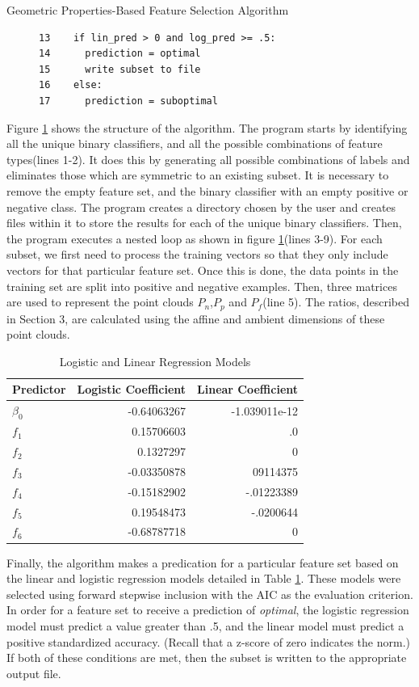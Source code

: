 \documentclass{llncs}
\begin{document}
\begin{section}{Geometric Properties-Based Feature Selection Algorithm}
\begin{figure}[h]
\begin{lstlisting}
13	  if lin_pred > 0 and log_pred >= .5:
14		prediction = optimal
15		write subset to file
16	  else:
17		prediction = suboptimal
\end{lstlisting}
\label{fig:code}
\end{figure}
Figure \ref{fig:code} shows the structure of the algorithm. The program starts by identifying all the unique binary classifiers, and all the possible combinations of feature types(lines 1-2). It does this by generating all possible combinations of  labels and eliminates those which are symmetric to an existing subset. It is necessary to remove the empty feature set, and the binary classifier with an empty positive or negative class. The program creates a directory chosen by the user and creates files within it to store the results for each of the unique binary classifiers. Then, the program executes a nested loop as shown in figure \ref{fig:code}(lines 3-9). 
For each subset, we first need to process the training vectors so that they only include vectors for that particular feature set. Once this is done, the data points in the training set are split into positive and negative examples. Then, three matrices are used to represent the point clouds $P_n$,$P_p$ and $P_f$(line 5). The ratios, described in Section 3, are calculated using the affine and ambient dimensions of these point clouds.
\begin{table}[ht]
\centering
\caption{Logistic and Linear Regression Models}
\begin{tabular}{l r r }
\hline \hline
Predictor&Logistic Coefficient & Linear Coefficient \\
\hline
$\beta_0$&-0.64063267&-1.039011e-12\\
$f_1$&0.15706603&.0\\
$f_2$&0.1327297& 0\\
$f_3$&-0.03350878&09114375\\
$f_4$&-0.15182902& -.01223389\\
$f_5$&0.19548473&-.0200644\\
$f_6$&-0.68787718&0\\
\hline
\end{tabular}
\label{tab:models}
\end{table}


Finally, the algorithm makes a predication for a particular feature set based on the linear and logistic regression models detailed in Table \ref{tab:models}. These models were selected using forward stepwise inclusion with the AIC as the evaluation criterion. In order for a feature set to receive a prediction of {\em optimal}, the logistic regression model must predict a value greater than .5, and the linear model must predict a positive standardized accuracy. (Recall that a z-score of zero indicates the norm.) If both of these conditions are met, then the subset is written to the appropriate output file.
 


\end{section}
\end{document}
